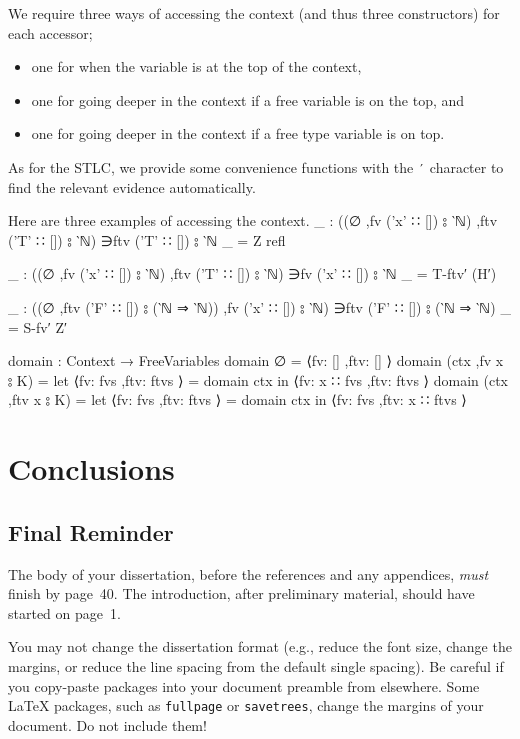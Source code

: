 \documentclass[logo,bsc,singlespacing,parskip,online]{infthesis}
\renewenvironment{code}{\mintedcopy[breaklines,breaksymbolleft=\;]{agda}}{\endmintedcopy}
\begin{document}
We require three ways of accessing the context (and thus three constructors) for each accessor;
\begin{itemize}
  \item one for when the variable is at the top of the context,
  \item one for going deeper in the context if a free variable is on the top, and
  \item one for going deeper in the context if a free type variable is on top.
\end{itemize}

As for the STLC, we provide some convenience functions with the \texttt{′} character to find the
relevant evidence automatically.

Here are three examples of accessing the context.
\begin{code}
  _ : ((∅ ,fv ('x' ∷ []) ⦂ ‵ℕ) ,ftv ('T' ∷ []) ⦂ ‵ℕ) ∋ftv ('T' ∷ []) ⦂ ‵ℕ
  _ = Z refl

  _ : ((∅ ,fv ('x' ∷ []) ⦂ ‵ℕ) ,ftv ('T' ∷ []) ⦂ ‵ℕ) ∋fv ('x' ∷ []) ⦂ ‵ℕ
  _ = T-ftv′ (H′)

  _ : ((∅ ,ftv ('F' ∷ []) ⦂ (‵ℕ ⇒ ‵ℕ)) ,fv ('x' ∷ []) ⦂ ‵ℕ) ∋ftv ('F' ∷ []) ⦂ (‵ℕ ⇒ ‵ℕ)
  _ = S-fv′ Z′
\end{code}

\begin{code}
  domain : Context → FreeVariables
  domain ∅ = ⟨fv: [] ,ftv: [] ⟩
  domain (ctx ,fv x ⦂ K) = let ⟨fv: fvs ,ftv: ftvs ⟩ = domain ctx
    in ⟨fv: x ∷ fvs ,ftv: ftvs ⟩
  domain (ctx ,ftv x ⦂ K) = let ⟨fv: fvs ,ftv: ftvs ⟩ = domain ctx
    in ⟨fv: fvs ,ftv: x ∷ ftvs ⟩
\end{code}

\chapter{Conclusions}

\section{Final Reminder}

The body of your dissertation, before the references and any appendices,
\emph{must} finish by page~40. The introduction, after preliminary material,
should have started on page~1.

You may not change the dissertation format (e.g., reduce the font size, change
the margins, or reduce the line spacing from the default single spacing). Be
careful if you copy-paste packages into your document preamble from elsewhere.
Some \LaTeX{} packages, such as \texttt{fullpage} or \texttt{savetrees}, change
the margins of your document. Do not include them!
\end{document}
